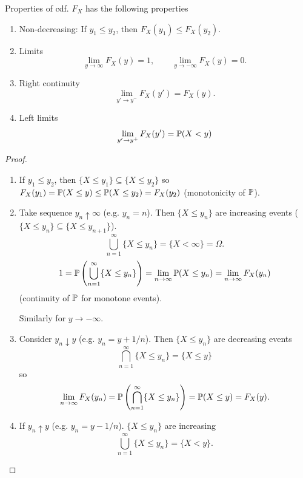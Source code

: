\documentclass[10pt, a4paper]{article}
\begin{document}
Properties of cdf.
$F_{X}$ has the following properties
\begin{proposition}
    \begin{enumerate}[label = (\roman*)]
        \item Non-decreasing:
        If $y_1 \leq y_2$,
        then $F_{X}(y_1) \leq F_{X}(y_2)$.
    
        \item Limits
        \[
        \lim_{y \to \infty}F_{X}(y) = 1,\qquad \lim_{y \to -\infty}F_{X}(y) = 0.
        \]
    
        \item Right continuity
        \[
        \lim_{y' \to y ^ {-}}F_{X}(y') = F_{X}(y).
        \]
    
        \item Left limits
        \[
        \lim_{y' \to y ^ {+}}F_{X}(y') =  \P(X < y)
        \]
    \end{enumerate}
    
    \begin{proof}
        \begin{enumerate}[label = (\roman*)]
            \item If $y_1 \leq y_2$,
            then $\{X \leq y_1\} \subseteq \{X \leq y_2\}$ so $F_{X}(y_1) = \P(X \leq y) \leq \P(X \leq y_2) = F_{X}(y_2)$
            (monotonicity of $\P$).

            \item Take sequence $y_n \uparrow \infty$
            (e.g. $y_n = n$).
            Then $\{X \leq y_n\}$ are increasing events
            ($\{X \leq y_n\} \subseteq \{X \leq y_{n + 1}\}$).
            \[
            \bigcup_{n = 1}^{\infty}\{X \leq y_n\} = \{X < \infty\} = \Omega.
            \]
            \[
            1 = \P\left(\bigcup_{n = 1}^{\infty}\{X \leq y_n\}\right) = \lim_{n \to \infty}\P(X \leq y_n) = \lim_{n \to \infty}F_{X}(y_n)
            \]
            (continuity of $\P$ for monotone events).

            Similarly for $y \to -\infty$.

            \item Consider $y_n \downarrow y$
            (e.g. $y_n = y + 1 / n$).
            Then $\{X \leq y_n\}$ are decreasing events
            \[
            \bigcap_{n = 1}^{\infty}\{X \leq y_n\} = \{X \leq y\}
            \]
            so
            \[
            \lim_{n \to \infty}F_{X}(y_n) = \P\left(\bigcap_{n = 1}^{\infty}\{X \leq y_n\}\right) = \P(X \leq y) = F_{X}(y).
            \]

            \item If $y_n \uparrow y$
            (e.g. $y_n = y - 1 / n$).
            $\{X \leq y_n\}$ are increasing
            \[
            \bigcup_{n = 1}^{\infty}\{X \leq y_n\} = \{X < y\}.
            \]
        \end{enumerate}
    \end{proof}
\end{proposition}
\end{document}

